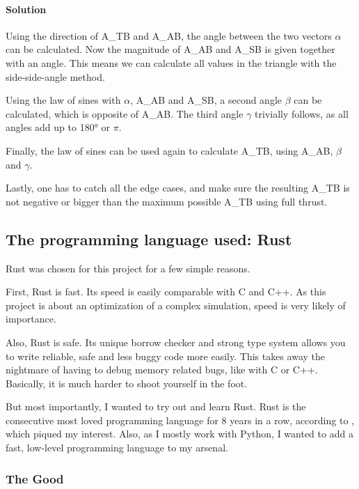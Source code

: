 \paragraph{Solution}

Using the direction of \gls{A_TB} and \gls{A_AB}, the angle between the two vectors \(\alpha\) can be calculated. Now the magnitude of \gls{A_AB} and \gls{A_SB} is given together with an angle. This means we can calculate all
values in the triangle with the side-side-angle method.

Using the law of sines with
\(\alpha\), \gls{A_AB} and \gls{A_SB}, a second angle \(\beta\) can be
calculated, which is opposite of \gls{A_AB}. The third angle \(\gamma\)
trivially follows, as all angles add up to 180° or \(\pi\).

Finally, the law of sines can be used again to calculate \gls{A_TB}, using
\gls{A_AB}, \(\beta\) and \(\gamma\).

Lastly, one has to catch all the edge cases, and make sure the resulting
\gls{A_TB} is not negative or bigger than the maximum possible \gls{A_TB} using full thrust.

\subsection{The programming language used:
  Rust}\label{the-programming-language-used-rust}

Rust was chosen for this project for a few simple reasons.

First, Rust is fast\cite{Benchmarks, BenchmarksGame}. Its speed is easily comparable with C and
C++. As this project is about an optimization of a complex simulation, speed
is very likely of importance.

Also, Rust is safe. Its unique borrow checker and strong type system allows
you to write reliable, safe and less buggy code more easily. This takes away
the nightmare of having to debug memory related bugs, like with C or C++.
Basically, it is much harder to shoot yourself in the foot.

But most importantly, I wanted to try out and learn Rust. Rust is the
consecutive most loved programming language for 8 years in a row, according to \cite{StackOverflow2023}, which piqued my interest. Also, as I mostly work with
Python, I wanted to add a fast, low-level programming language to my arsenal.

\subsubsection{The Good}\label{the-good}

